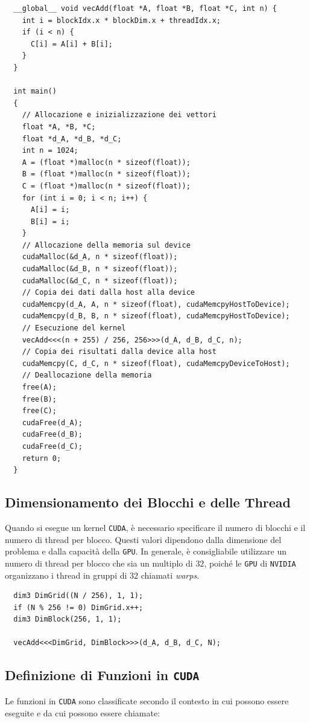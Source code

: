 \begin{lstlisting}
  __global__ void vecAdd(float *A, float *B, float *C, int n) {
    int i = blockIdx.x * blockDim.x + threadIdx.x;
    if (i < n) {
      C[i] = A[i] + B[i];
    }
  }

  int main()
  {
    // Allocazione e inizializzazione dei vettori
    float *A, *B, *C;
    float *d_A, *d_B, *d_C;
    int n = 1024;
    A = (float *)malloc(n * sizeof(float));
    B = (float *)malloc(n * sizeof(float));
    C = (float *)malloc(n * sizeof(float));
    for (int i = 0; i < n; i++) {
      A[i] = i;
      B[i] = i;
    }
    // Allocazione della memoria sul device
    cudaMalloc(&d_A, n * sizeof(float));
    cudaMalloc(&d_B, n * sizeof(float));
    cudaMalloc(&d_C, n * sizeof(float));
    // Copia dei dati dalla host alla device
    cudaMemcpy(d_A, A, n * sizeof(float), cudaMemcpyHostToDevice);
    cudaMemcpy(d_B, B, n * sizeof(float), cudaMemcpyHostToDevice);
    // Esecuzione del kernel
    vecAdd<<<(n + 255) / 256, 256>>>(d_A, d_B, d_C, n);
    // Copia dei risultati dalla device alla host
    cudaMemcpy(C, d_C, n * sizeof(float), cudaMemcpyDeviceToHost);
    // Deallocazione della memoria
    free(A);
    free(B);
    free(C);
    cudaFree(d_A);
    cudaFree(d_B);
    cudaFree(d_C);
    return 0;
  }
\end{lstlisting}

\subsection{Dimensionamento dei Blocchi e delle Thread}
Quando si esegue un kernel \texttt{CUDA}, è necessario specificare
il numero di blocchi e il numero di thread per blocco. Questi valori
dipendono dalla dimensione del problema e dalla capacità della \texttt{GPU}.
In generale, è consigliabile utilizzare un numero di thread per blocco
che sia un multiplo di \(32\), poiché le \texttt{GPU} di \texttt{NVIDIA}
organizzano i thread in gruppi di \(32\) chiamati \textit{warps}.
\begin{lstlisting}
  dim3 DimGrid((N / 256), 1, 1);
  if (N % 256 != 0) DimGrid.x++;
  dim3 DimBlock(256, 1, 1);

  vecAdd<<<DimGrid, DimBlock>>>(d_A, d_B, d_C, N);
\end{lstlisting}
\subsection{Definizione di Funzioni in \texttt{CUDA}}

Le funzioni in \texttt{CUDA} sono classificate secondo il contesto in
cui possono essere eseguite e da cui possono essere chiamate:

